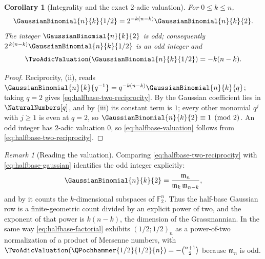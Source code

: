 \documentclass[11pt,a4paper,oneside,openany]{book}
\newtheorem{corollary}[corollary]{Corollary}
\theoremstyle{definition}
\theoremstyle{remark}
\newtheorem{remark}[remark]{Remark}
\newcommand{\F}{\mathbb F}
\begin{document}
\begin{corollary}[Integrality and the exact $2$-adic valuation]\label{cor:halfbase-gaussian-valuation}
For $0\le k\le n$,
\begin{equation}\label{eq:halfbase-two-reciprocity}
 \GaussianBinomial{n}{k}{1/2}=2^{-k(n-k)}\GaussianBinomial{n}{k}{2} .
\end{equation}
The integer $\GaussianBinomial{n}{k}{2}$ is odd; consequently $2^{\,k(n-k)}\GaussianBinomial{n}{k}{1/2}$ is an odd integer and
\begin{equation}\label{eq:halfbase-valuation}
 \TwoAdicValuation\!\left(\GaussianBinomial{n}{k}{1/2}\right)=-k(n-k).
\end{equation}
\end{corollary}

\begin{proof}
Reciprocity, (ii), reads $\GaussianBinomial{n}{k}{q^{-1}}=q^{-k(n-k)}\GaussianBinomial{n}{k}{q}$; taking $q=2$ gives \eqref{eq:halfbase-two-reciprocity}.  By  the Gaussian coefficient lies in $\NaturalNumbers[q]$, and by (iii) its constant term is $1$; every other monomial $q^j$ with $j\ge1$ is even at $q=2$, so $\GaussianBinomial{n}{k}{2}\equiv1\pmod2$.  An odd integer has $2$-adic valuation $0$, so \eqref{eq:halfbase-valuation} follows from \eqref{eq:halfbase-two-reciprocity}.
\end{proof}

\begin{remark}[Reading the valuation]\label{rem:halfbase-valuation-reading}
Comparing \eqref{eq:halfbase-two-reciprocity} with \eqref{eq:halfbase-gaussian} identifies the odd integer explicitly:
\[
 \GaussianBinomial{n}{k}{2}=\frac{\mathfrak m_n}{\mathfrak m_k\,\mathfrak m_{n-k}},
\]
and by  it counts the $k$-dimensional subspaces of $\F_2^n$.  Thus the half-base Gaussian row is a finite-geometric count divided by an explicit power of two, and the exponent of that power is $k(n-k)$, the dimension of the Grassmannian.  In the same way \eqref{eq:halfbase-factorial} exhibits $(1/2;1/2)_n$ as a power-of-two normalization of a product of Mersenne numbers, with $\TwoAdicValuation\!\left(\QPochhammer{1/2}{1/2}{n}\right)=-\binom{n+1}{2}$ because $\mathfrak m_n$ is odd.
\end{remark}
\end{document}

